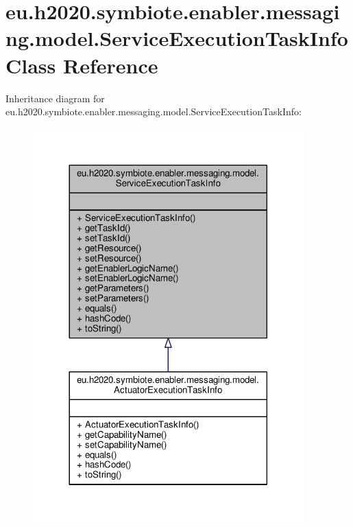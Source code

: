 \hypertarget{classeu_1_1h2020_1_1symbiote_1_1enabler_1_1messaging_1_1model_1_1ServiceExecutionTaskInfo}{}\section{eu.\+h2020.\+symbiote.\+enabler.\+messaging.\+model.\+Service\+Execution\+Task\+Info Class Reference}
\label{classeu_1_1h2020_1_1symbiote_1_1enabler_1_1messaging_1_1model_1_1ServiceExecutionTaskInfo}


Inheritance diagram for eu.\+h2020.\+symbiote.\+enabler.\+messaging.\+model.\+Service\+Execution\+Task\+Info\+:\nopagebreak
\begin{figure}[H]
\begin{center}
\leavevmode
\includegraphics[width=296pt]{classeu_1_1h2020_1_1symbiote_1_1enabler_1_1messaging_1_1model_1_1ServiceExecutionTaskInfo__inherit__graph}
\end{center}
\end{figure}


